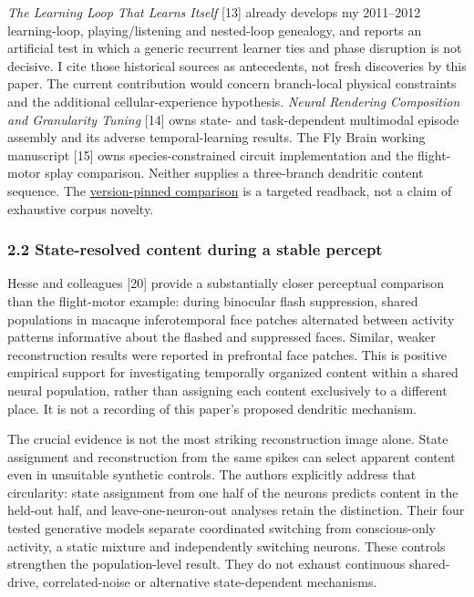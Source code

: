 \documentclass[
  american,
  11pt,
  letterpaper,
]{article}
\begin{document}
\emph{The Learning Loop That Learns Itself} {[}13{]} already develops my 2011--2012 learning-loop, playing/listening and nested-loop genealogy, and reports an artificial test in which a generic recurrent learner ties and phase disruption is not decisive. I cite those historical sources as antecedents, not fresh discoveries by this paper. The current contribution would concern branch-local physical constraints and the additional cellular-experience hypothesis. \emph{Neural Rendering Composition and Granularity Tuning} {[}14{]} owns state- and task-dependent multimodal episode assembly and its adverse temporal-learning results. The Fly Brain working manuscript {[}15{]} owns species-constrained circuit implementation and the flight-motor splay comparison. Neither supplies a three-branch dendritic content sequence. The \href{https://github.com/v5ma/v5ma.github.io/blob/f6d3867df89ae9dea32f763b1d55c84212c41cc6/papers/companions/five-papers-20260923/temporal/paper/reviews/ADJACENT-PAPER-OWNERSHIP-READBACK-20260922.md}{version-pinned comparison} is a targeted readback, not a claim of exhaustive corpus novelty.

\subsubsection{2.2 State-resolved content during a stable percept}\label{state-resolved-content-during-a-stable-percept}

Hesse and colleagues {[}20{]} provide a substantially closer perceptual comparison than the flight-motor example: during binocular flash suppression, shared populations in macaque inferotemporal face patches alternated between activity patterns informative about the flashed and suppressed faces. Similar, weaker reconstruction results were reported in prefrontal face patches. This is positive empirical support for investigating temporally organized content within a shared neural population, rather than assigning each content exclusively to a different place. It is not a recording of this paper's proposed dendritic mechanism.

The crucial evidence is not the most striking reconstruction image alone. State assignment and reconstruction from the same spikes can select apparent content even in unsuitable synthetic controls. The authors explicitly address that circularity: state assignment from one half of the neurons predicts content in the held-out half, and leave-one-neuron-out analyses retain the distinction. Their four tested generative models separate coordinated switching from conscious-only activity, a static mixture and independently switching neurons. These controls strengthen the population-level result. They do not exhaust continuous shared-drive, correlated-noise or alternative state-dependent mechanisms.
\end{document}
